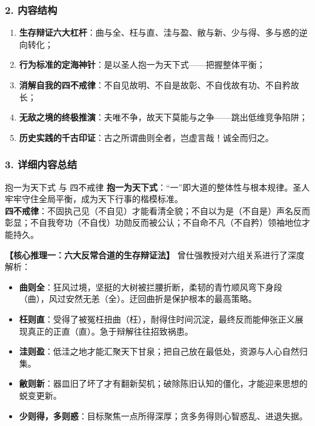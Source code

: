 \subsubsection{2. 内容结构}
\begin{enumerate}
    \item \textbf{生存辩证六大杠杆}：曲与全、枉与直、洼与盈、敝与新、少与得、多与惑的逆向转化；
    \item \textbf{行为标准的定海神针}：是以圣人抱一为天下式——把握整体平衡；
    \item \textbf{消解自我的四不戒律}：不自见故明、不自是故彰、不自伐故有功、不自矜故长；
    \item \textbf{无敌之境的终极推演}：夫唯不争，故天下莫能与之争——跳出低维竞争陷阱；
    \item \textbf{历史实践的千古印证}：古之所谓曲则全者，岂虚言哉！诚全而归之。
\end{enumerate}

\subsubsection{3. 详细内容总结}

\begin{ConceptBox}{抱一为天下式 与 四不戒律}
\textbf{抱一为天下式}：“一”即大道的整体性与根本规律。圣人牢牢守住全局平衡，成为天下行事的楷模标准。\\
\textbf{四不戒律}：不固执己见（不自见）才能看清全貌；不自以为是（不自是）声名反而彰显；不自我夸功（不自伐）功勋反而被公认；不自命不凡（不自矜）领袖地位才能持久。
\end{ConceptBox}

\noindent\textbf{【核心推理一：六大反常合道的生存辩证法】}
曾仕强教授对六组关系进行了深度解析：
\begin{itemize}
    \item \textbf{曲则全}：狂风过境，坚挺的大树被拦腰折断，柔韧的青竹顺风弯下身段（曲），风过安然无恙（全）。迂回曲折是保护根本的最高策略。
    \item \textbf{枉则直}：受得了被冤枉扭曲（枉），耐得住时间沉淀，最终反而能伸张正义展现真正的正直（直）。急于辩解往往招致祸患。
    \item \textbf{洼则盈}：低洼之地才能汇聚天下甘泉；把自己放在最低处，资源与人心自然归集。
    \item \textbf{敝则新}：器皿旧了坏了才有翻新契机；破除陈旧认知的僵化，才能迎来思想的蜕变更新。
    \item \textbf{少则得，多则惑}：目标聚焦一点所得深厚；贪多务得则心智惑乱、进退失据。
\end{itemize}

